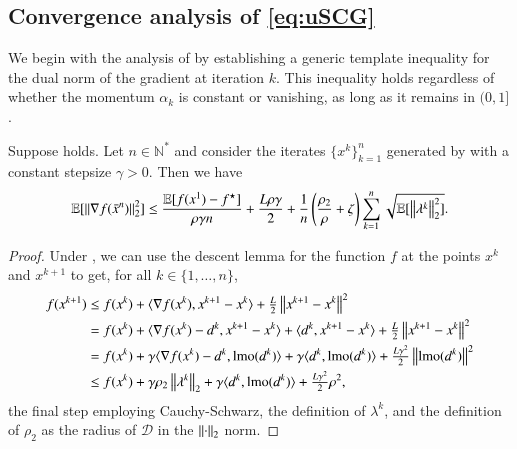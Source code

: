 \begin{toappendix}
\subsection{Convergence analysis of \ref{eq:uSCG}}\label{subsec:uSCG}
We begin with the analysis of  by establishing a generic template inequality for the dual norm of the gradient at iteration $k$. This inequality holds regardless of whether the momentum $\alpha_k$ is constant or vanishing, as long as it remains in $(0,1]$.
\begin{lemma}
\label{lem:uSCGtemplate1}
    Suppose  holds. Let $n\in\mathbb{N}^*$ and consider the iterates $\{x^{k}\}_{k=1}^n$ generated by  with a constant stepsize $\gamma>0$.
    Then we have
    \begin{equation}
        \mathbb{E}[\left\Vert{\nabla f(\bar{x}^n)}\right\Vert_2^2]\leq \frac{\mathbb{E}[f(x^{1})-f^\star]}{\rho\gamma n} +\frac{L\rho\gamma}{2} + \frac{1}{n}\left(\frac{\rho_2}{\rho}+\zeta\right)\sum\limits_{k=1}^n\sqrt{\mathbb{E}[\left\Vert{\lambda^{k}}\right\Vert_2^2]}.
    \end{equation}
\end{lemma}
\begin{proof}
    Under , we can use the descent lemma for the function $f$ at the points $x^{k}$ and $x^{k+1}$ to get, for all $k\in\{1,\ldots,n\}$,
    \begin{equation}\label{eq:lem:uSCGtemplate1:first2}
        \begin{aligned}
            f(x^{k+1})&\leq f(x^{k})+ \langle \nabla f(x^{k}),x^{k+1}-x^{k}\rangle +\tfrac{L}{2}\left\Vert{x^{k+1}-x^{k}}\right\Vert^{2}
            \\
            &= f(x^{k})+\langle \nabla f(x^{k})-d^{k},x^{k+1}-x^{k}\rangle + \langle d^{k},x^{k+1}-x^{k}\rangle+\tfrac{L}{2}\left\Vert{x^{k+1}-x^{k}}\right\Vert^{2}
            \\
            &= f(x^{k})+\gamma \langle \nabla f(x^{k})-d^{k},\operatorname{lmo} (d^{k})\rangle+\gamma \langle d^{k},\operatorname{lmo}(d^{k})\rangle +\tfrac{L\gamma^{2}}{2}\left\Vert{\operatorname{lmo}(d^{k})}\right\Vert^{2}
            \\
            &\leq f(x^{k})+\gamma \rho_{2}\left\Vert{\lambda^{k}}\right\Vert_{2}+\gamma \langle d^{k},\operatorname{lmo}(d^{k})\rangle +\tfrac{L\gamma^{2}}{2}\rho^{2},
        \end{aligned}
    \end{equation}
    the final step employing Cauchy-Schwarz, the definition of $\lambda^k$, and the definition of $\rho_2$ as the radius of $\mathcal{D}$ in the $\left\Vert{\cdot}\right\Vert_2$ norm.

\end{proof}
\end{toappendix}
